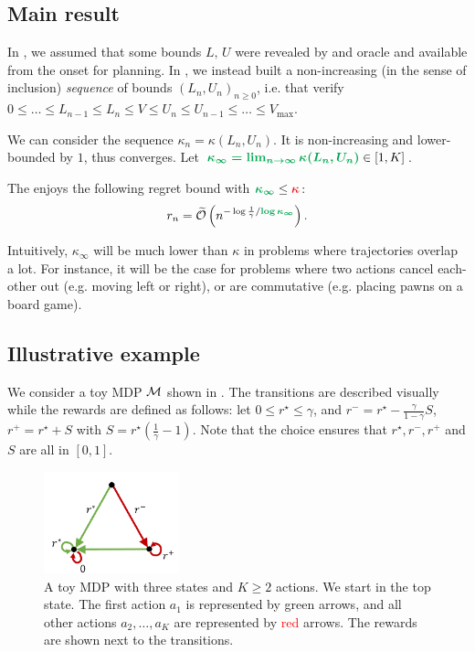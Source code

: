 \documentclass[runningheads]{llncs}
\begin{document}
\subsection{Main result}

In , we assumed that some bounds $L,\,U$ were revealed by and oracle and available from the onset for planning. In , we instead built a non-increasing (in the sense of inclusion) \emph{sequence} of bounds $(L_n,U_n)_{n\geq 0}$, i.e. that verify $0\leq \dots\leq L_{n-1}\leq L_n\leq V\leq U_n\leq U_{n-1}\leq \dots\leq V_{\max}$.

We can consider the sequence $\kappa_n = \kappa(L_n, U_n)$. It is non-increasing and lower-bounded by $1$, thus converges. Let $\hlgb{\kappa_\infty = \lim_{n\rightarrow\infty} \kappa(L_n, U_n)} \in[1,K]$.

\begin{theorem}
\label{thm:regret-state-aware}
The  enjoys the following regret bound with $\hlgb{\kappa_\infty} \leq \hlrb{\kappa}$: 
\begin{align*}
r_n = \tilde{\cO}\left(n^{-\log \frac{1}{\gamma}/\hlgb{\log \kappa_\infty}}\right).
\end{align*}
\end{theorem}

Intuitively, $\kappa_\infty$ will be much lower than $\kappa$ in problems where trajectories overlap a lot. For instance, it will be the case for problems where two actions cancel each-other out (e.g. moving left or right), or are commutative (e.g. placing pawns on a board game).

\subsection{Illustrative example}
\label{sec:illustrative-example}
We consider a toy MDP $\mathcal{M}$ shown in . The transitions are described visually while the rewards are defined as follows: let $0\leq r^\star\leq \gamma$, and $ r^- = r^\star - \frac{\gamma}{1-\gamma} S$, $r^+ = r^\star + S$ with $S = r^\star\left(\frac{1}{\gamma} - 1\right).$ Note that the choice ensures that $r^\star, r^-, r^+$ and $S$ are all in $[0, 1]$.

\begin{figure}[htp]
    \centering
    \includegraphics[width=0.35\textwidth]{img/mdp.pdf}
    \caption{A toy MDP with three states and $K \geq 2$ actions. We start in the top state. The first action $a_1$ is represented by \textcolor{OliveGreen}{green} arrows, and all other actions $a_2, \dots, a_K$ are represented by \textcolor{red}{red} arrows. The rewards are shown next to the transitions.}
    \label{fig:mdp}
\end{figure}
\end{document}
